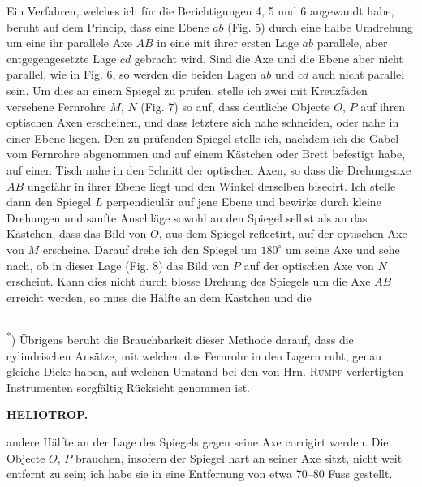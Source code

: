 \par\noindent\hspace*{\parindent}Ein Verfahren, welches ich für die Berichtigungen 4, 5 und 6 angewandt habe, beruht auf dem Princip, dass eine Ebene $ab$ (Fig. 5) durch eine halbe Umdrehung um eine ihr parallele Axe $AB$ in eine mit ihrer ersten Lage $ab$ parallele, aber entgegengesetzte Lage $cd$ gebracht wird. Sind die Axe und die Ebene aber nicht parallel, wie in Fig. 6, so werden die beiden Lagen $ab$ und $cd$ auch nicht parallel sein. Um dies an einem Spiegel zu prüfen, stelle ich zwei mit Kreuzfäden versehene Fernrohre $M$, $N$ (Fig. 7) so auf, dass deutliche Objecte $O$, $P$ auf ihren optischen Axen erscheinen, und dass letztere sich nahe schneiden, oder nahe in einer Ebene liegen. Den zu prüfenden Spiegel stelle ich, nachdem ich die Gabel vom Fernrohre abgenommen und auf einem Kästchen oder Brett befestigt habe, auf einen Tisch nahe in den Schnitt der optischen Axen, so dass die Drehungsaxe $AB$ ungefähr in ihrer Ebene liegt und den Winkel derselben bisecirt. Ich stelle dann den Spiegel $L$ perpendiculär auf jene Ebene und bewirke durch kleine Drehungen und sanfte Anschläge sowohl an den Spiegel selbst als an das Kästchen, dass das Bild von $O$, aus dem Spiegel reflectirt, auf der optischen Axe von $M$ erscheine. Darauf drehe ich den Spiegel um $180^\circ$ um seine Axe und sehe nach, ob in dieser Lage (Fig. 8) das Bild von $P$ auf der optischen Axe von $N$ erscheint. Kann dies nicht durch blosse Drehung des Spiegels um die Axe $AB$ erreicht werden, so muss die Hälfte an dem Kästchen und die
\par\medskip\noindent\rule{4cm}{.4pt}\par
\begingroup\footnotesize\noindent\hspace*{\parindent}\textsuperscript{*}) Übrigens beruht die Brauchbarkeit dieser Methode darauf, dass die cylindrischen Ansätze, mit welchen das Fernrohr in den Lagern ruht, genau gleiche Dicke haben, auf welchen Umstand bei den von Hrn. \textsc{Rumpf} verfertigten Instrumenten sorgfältig Rücksicht genommen ist.\par\endgroup
\par\medskip\noindent{}\par

\par\clearpage
\noindent{}\hfill{\small\textbf{HELIOTROP.}}\hfill\null\par\medskip
\noindent andere Hälfte an der Lage des Spiegels gegen seine Axe corrigirt werden. Die Objecte $O$, $P$ brauchen, insofern der Spiegel hart an seiner Axe sitzt, nicht weit entfernt zu sein; ich habe sie in eine Entfernung von etwa 70--80 Fuss gestellt.

